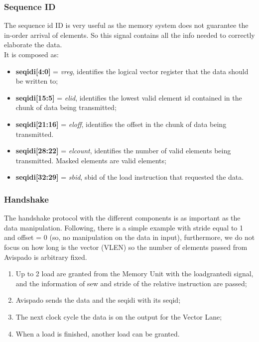 \subsubsection{Sequence ID}
The sequence id ID is very useful as the memory system does not guarantee the in-order arrival of elements. So this signal contains all the info needed to correctly elaborate the data.\\

It is composed as:
\begin{itemize}
    \item \textbf{seq\+id\+i[4:0]} = \textit{v\+reg}, identifies the logical vector register that the data should be written to;
    
    \item \textbf{seq\+id\+i[15:5]} = \textit{el\+id}, identifies the lowest valid element id contained in the chunk of data being transmitted;
    
    \item \textbf{seq\+id\+i[21:16]} = \textit{el\+off}, identifies the offset in the chunk of data being transmitted.
    
    \item \textbf{seq\+id\+i[28:22]} = \textit{el\+count}, identifies the number of valid elements being transmitted. Masked elements are valid elements; 
    
    \item \textbf{seq\+id\+i[32:29]} = \textit{sb\+id}, sb\+id of the load instruction that requested the data.
\end{itemize}


\subsubsection{Handshake}
The handshake protocol with the different components is as important as the data manipulation. Following, there is a simple example with stride equal to 1 and offset = 0 (so, no manipulation on the data in input), furthermore, we do not focus on how long is the vector (VLEN) so the number of elements passed from Avispado is arbitrary fixed.

\begin{enumerate}
    \item Up to 2 load are granted from the Memory Unit with the load\+granted\+i signal, and the information of sew and stride of the relative instruction are passed;
    
    \item Avispado sends the data and the seq\+id\+i with its seq\+id;
    
    \item The next clock cycle the data is on the output for the Vector Lane;
    
    \item When a load is finished, another load can be granted.
\end{enumerate}

